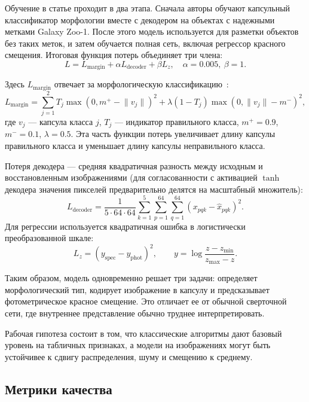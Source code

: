 \documentclass[12pt,a4paper]{article}
\begin{document}
Обучение в статье проходит в два этапа. Сначала авторы обучают капсульный классификатор морфологии вместе с декодером на объектах с надежными метками Galaxy Zoo-1. После этого модель используется для разметки объектов без таких меток, и затем обучается полная сеть, включая регрессор красного смещения. Итоговая функция потерь объединяет три члена:
\begin{equation}
L = L_{\mathrm{margin}} + \alpha L_{\mathrm{decoder}} + \beta L_z, \quad
\alpha = 0.005,\ \beta = 1.
\end{equation}

Здесь $L_{\mathrm{margin}}$ отвечает за морфологическую классификацию~\cite{sabour2017capsnet}:
\begin{equation}
L_{\mathrm{margin}} =
\sum_{j=1}^{2}
T_j \max(0, m^+ - \lVert v_j \rVert)^2
+ \lambda (1 - T_j)\max(0, \lVert v_j \rVert - m^-)^2,
\end{equation}
где $v_j$ — капсула класса $j$, $T_j$ — индикатор правильного класса, $m^+=0.9$, $m^-=0.1$, $\lambda=0.5$. Эта часть функции потерь увеличивает длину капсулы правильного класса и уменьшает длину капсулы неправильного класса.

Потеря декодера — средняя квадратичная разность между исходным и восстановленным изображениями (для согласованности с активацией $\tanh$ декодера значения пикселей предварительно делятся на масштабный множитель):
\begin{equation}
L_{\mathrm{decoder}} =
\frac{1}{5 \cdot 64 \cdot 64}\sum_{k=1}^{5}\sum_{p=1}^{64}\sum_{q=1}^{64}
(x_{pqk} - \hat{x}_{pqk})^2.
\end{equation}
Для регрессии используется квадратичная ошибка в логистически преобразованной шкале:
\begin{equation}
L_z = (y_{\mathrm{spec}} - y_{\mathrm{phot}})^2,\qquad
y = \log\frac{z - z_{\min}}{z_{\max} - z}.
\end{equation}

Таким образом, модель одновременно решает три задачи: определяет морфологический тип, кодирует изображение в капсулу и предсказывает фотометрическое красное смещение. Это отличает ее от обычной сверточной сети, где внутреннее представление обычно труднее интерпретировать.

Рабочая гипотеза состоит в том, что классические алгоритмы дают базовый уровень на табличных признаках, а модели на изображениях могут быть устойчивее к сдвигу распределения, шуму и смещению к среднему.

\subsection{Метрики качества}
\end{document}
